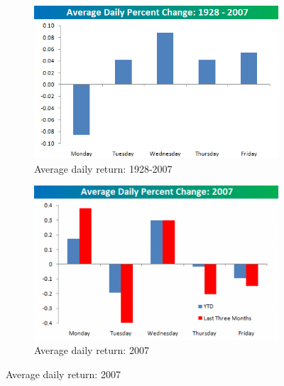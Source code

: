 \begin{description}
\begin{figure}[h!]
\centering
\begin{subfigure}[b]{0.45\textwidth}
 \includegraphics[width=\textwidth]{img/average_daily_change_1928_2007}
 \caption{Average daily return: 1928-2007}
 \label{fig:mondayeffect}
\end{subfigure}
\begin{subfigure}[b]{0.45\textwidth}
 \includegraphics[width=\textwidth]{img/thumb-average_daily_change_2007}
 \caption{Average daily return: 2007}
 \label{fig:mondayeffect2}
\end{subfigure}
\end{figure}

\end{description}

